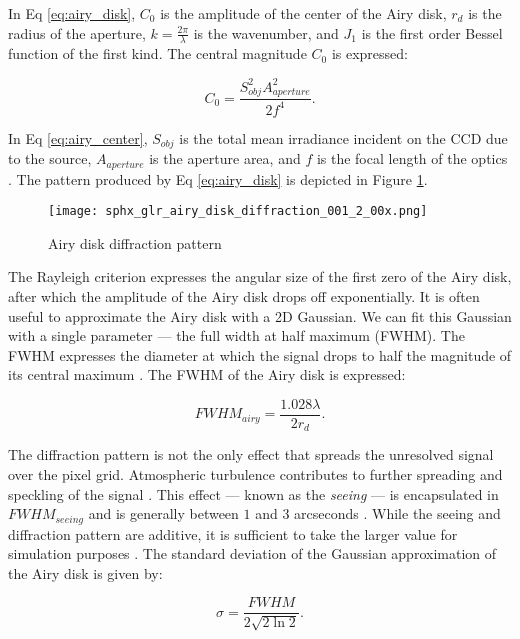 In Eq \ref{eq:airy_disk}, $C_0$ is the amplitude of the center of the Airy disk, $r_d$ is the radius of the aperture, $k = \frac{2\pi}{\lambda}$ is the wavenumber, and $J_1$ is the first order Bessel function of the first kind. The central magnitude $C_0$ is expressed:

\begin{equation} \label{eq:airy_center}
  C_0 = \frac{S_{obj}^2 A_{aperture}^2}{2 f^4}.
\end{equation}

In Eq \ref{eq:airy_center}, $S_{obj}$ is the total mean irradiance incident on the CCD due to the source, $A_{aperture}$ is the aperture area, and $f$ is the focal length of the optics \cite{frueh2019notes}. The pattern produced by Eq \ref{eq:airy_disk} is depicted in Figure \ref{fig:airy_disk_magnitude}.

\begin{figure}[ht]
  \centering
  \texttt{[image: sphx\_glr\_airy\_disk\_diffraction\_001\_2\_00x.png]}
  \caption{Airy disk diffraction pattern}
  \label{fig:airy_disk_magnitude}
\end{figure}

The Rayleigh criterion expresses the angular size of the first zero of the Airy disk, after which the amplitude of the Airy disk drops off exponentially. It is often useful to approximate the Airy disk with a 2D Gaussian. We can fit this Gaussian with a single parameter --- the full width at half maximum (FWHM). The FWHM expresses the diameter at which the signal drops to half the magnitude of its central maximum \cite{frueh2019notes}. The FWHM of the Airy disk is expressed:

\begin{equation} \label{eq:fwhm_airy}
  FWHM_{airy} = \frac{1.028 \lambda}{2 r_d}.
\end{equation}

The diffraction pattern is not the only effect that spreads the unresolved signal over the pixel grid. Atmospheric turbulence contributes to further spreading and speckling of the signal \cite{frueh2019notes}. This effect --- known as the \textit{seeing} --- is encapsulated in $FWHM_{seeing}$ and is generally between $1$ and $3$ arcseconds \cite{frueh2019notes}. While the seeing and diffraction pattern are additive, it is sufficient to take the larger value for simulation purposes \cite{frueh2019notes}. The standard deviation of the Gaussian approximation of the Airy disk is given by:

\begin{equation} \label{eq:airy_variance}
  \sigma = \frac{FWHM}{2 \sqrt{2 \ln{2}}}.
\end{equation}


